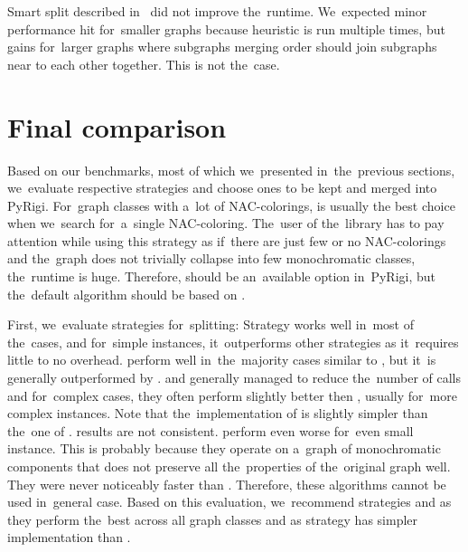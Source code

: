 Smart split described in~
did not improve the~runtime.
We~expected minor performance hit for~smaller graphs because heuristic is run
multiple times, but gains for~larger graphs where subgraphs merging order
should join subgraphs near to each other together. This is not the~case.

\section{Final comparison}

Based on our benchmarks, most of which we~presented in~the~previous sections,
we~evaluate respective strategies and choose ones
to be kept and merged into PyRigi.
%
For~graph classes with a~lot of NAC-colorings,
\NaiveCycles{} is usually the best choice
when we~search for~a~single NAC-coloring.
%
The~user of the~library has to pay attention while using this strategy
as if~there are just few or no NAC-colorings and the~graph does not trivially collapse
into few monochromatic classes, the~runtime is huge.
Therefore, \NaiveCycles{} should be an~available option in~PyRigi,
but the~default algorithm should be based on \Subgraphs{}.

First, we~evaluate strategies for~splitting:
Strategy \None{} works well in~most of the~cases, and for~simple
instances, it~outperforms other strategies as it~requires little to no overhead.
%
\CyclesMatchChunks{} perform well in~the~majority cases similar to \None{},
but it~is generally outperformed by \Neighbors{}.
%
\Neighbors{} and \NeighborsDegree{} generally managed to reduce the~number
of \IsNACColoring{} calls and for~complex cases, they often
perform slightly better then \None{}, usually for~more complex instances.
Note that the~implementation of \Neighbors{} is slightly simpler than
the~one of \NeighborsDegree{}.
%
\KernighanLin{} results are not consistent.
\Cuts{} perform even worse for~even small instance.
This is probably because they operate on a~graph of monochromatic
components that does not preserve all the~properties
of the~original graph well.
They were never noticeably faster than \Neighbors{}.
Therefore, these algorithms cannot be used in~general case.
%
Based on this evaluation, we~recommend strategies \None{} and \Neighbors{}
as they perform the~best across all graph classes and
as \Neighbors{} strategy has simpler implementation than \NeighborsDegree{}.

